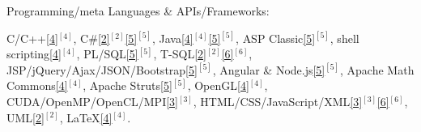 \begin{cventries}

\vspace{-0.25cm}

  \cventry
    {Programming/meta Languages \& APIs/Frameworks:} %
    {} %
    {} %
    {} %
    {
      \vspace{0.1cm}     
      \begin{cvitems} %
        \item[] {
		\textcolor{rainbowcolor-indigo}{C/C++\ref{4}{$^{[4]}$}},
		\textcolor{rainbowcolor-indigo}{C\#\ref{2}{$^{[2]}$}\ref{5}{$^{[5]}$}},
		\textcolor{rainbowcolor-indigo}{Java\ref{4}{$^{[4]}$}\ref{5}{$^{[5]}$}},
		\textcolor{rainbowcolor-indigo}{ASP Classic\ref{5}{$^{[5]}$}},
		\textcolor{rainbowcolor-indigo}{shell scripting\ref{4}{$^{[4]}$}},
		\textcolor{rainbowcolor-indigo}{PL/SQL\ref{5}{$^{[5]}$}},
		\textcolor{rainbowcolor-indigo}{T-SQL\ref{2}{$^{[2]}$}\ref{6}{$^{[6]}$}},
		\textcolor{rainbowcolor-indigo}{JSP/jQuery/Ajax/JSON/Bootstrap\ref{5}{$^{[5]}$}},
		\textcolor{rainbowcolor-indigo}{Angular %
	    	\& Node.js\ref{5}{$^{[5]}$}},
        \textcolor{rainbowcolor-indigo}{Apache Math Commons\ref{4}{$^{[4]}$}},  
	    \textcolor{rainbowcolor-indigo}{Apache Struts\ref{5}{$^{[5]}$}},
	    \textcolor{rainbowcolor-indigo}{OpenGL\ref{4}{$^{[4]}$}},
	    \textcolor{rainbowcolor-indigo}{CUDA/OpenMP/OpenCL/MPI\ref{3}{$^{[3]}$}},
	    \textcolor{rainbowcolor-indigo}{HTML/CSS/JavaScript/XML\ref{3}{$^{[3]}$}\ref{6}{$^{[6]}$}},
	    \textcolor{rainbowcolor-indigo}{UML\ref{2}{$^{[2]}$}},
	    \textcolor{rainbowcolor-indigo}{LaTeX\ref{4}{$^{[4]}$}}.
	    }
	  \end{cvitems}
    }  


\end{cventries}
